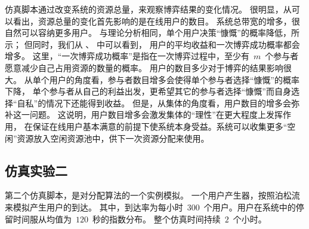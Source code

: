 仿真脚本通过改变系统的资源总量，来观察博弈结果的变化情况。
很明显，从可以看出，资源总量的变化首先影响的是在线用户的数目。
系统总带宽的增多，很自然可以容纳更多用户。
与理论分析相同，单个用户决策“慷慨”的概率降低，所示；
但同时，我们从
、
中可以看到，
用户的平均收益和一次博弈成功概率都会增多。
这里，“一次博弈成功概率”是指在一次博弈过程中，至少有~$m$~个参与者愿意减少自己占用资源的数量的概率。
用户的数目多少对于博弈的结果影响很大。
从单个用户的角度看，参与者数目增多会使得单个参与者选择“慷慨”的概率下降，
单个参与者从自己的利益出发，更希望其它的参与者选择“慷慨”而自身选择“自私”的情况下还能得到收益。
但是，从集体的角度看，用户数目的增多会弥补这一问题。
这说明，用户数目增多会激发集体的“理性”在更大程度上发挥作用，
在保证在线用户基本满意的前提下使系统本身受益。系统可以收集更多“空闲”资源放入空闲资源池中，供下一次资源分配来使用。
\subsection{仿真实验二}
第二个仿真脚本，是对分配算法的一个实例模拟。
一个用户产生器，按照泊松流来模拟产生用户的到达。
其中，到达率为每小时~$300$~个用户。用户在系统中的停留时间服从均值为~$120$~秒的指数分布。
整个仿真时间持续~$2$~个小时。


